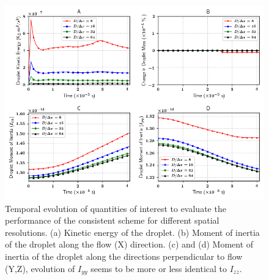 \begin{figure}
\begin{center}
\includegraphics[width = 1.5\textwidth]{plots/raindrop/jcp_1.png}
\end{center}
\vspace*{-0.5cm}
\caption{Temporal evolution of quantities of interest to evaluate the 
performance of the consistent scheme for different spatial resolutions. 
(a) Kinetic energy of the droplet. 
(b) Moment of inertia of the droplet along the flow (X) direction. 
(c) and (d) Moment of inertia of the droplet along the directions 
perpendicular to flow (Y,Z), evolution of $I_{yy}$ 
seems to be more or less identical to $I_{zz}$.}
\label{multi_jcp}
\end{figure}

